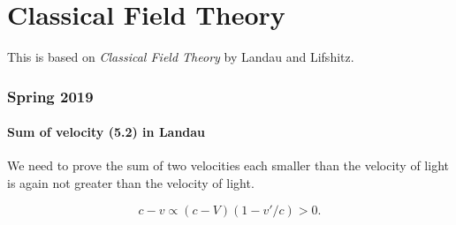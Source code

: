 \documentclass[10pt]{article}
\begin{document}
\part{Classical Field Theory}
This is based on \textit{Classical Field Theory} by Landau and Lifshitz.
\section{Spring 2019}

\subsection{Sum of velocity (5.2) in Landau}
We need to prove the sum of two velocities each smaller than the velocity of light is again not greater than the velocity of light.

\begin{equation}
	c - v \propto (c-V)(1-v'/c) >0.
\end{equation}
\end{document}
